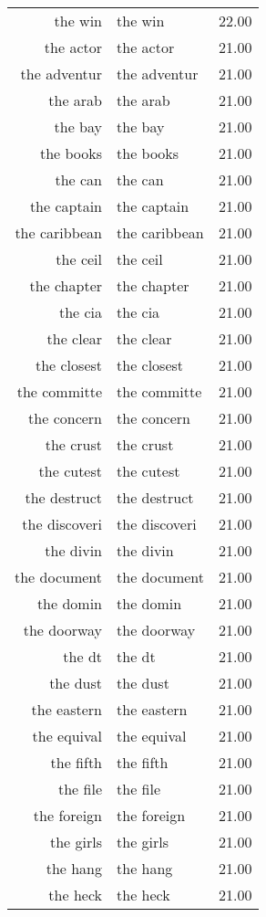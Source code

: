 \begin{table}[ht]
\begin{tabular}{rlr}
  the win & the win & 22.00 \\ 
  the actor & the actor & 21.00 \\ 
  the adventur & the adventur & 21.00 \\ 
  the arab & the arab & 21.00 \\ 
  the bay & the bay & 21.00 \\ 
  the books & the books & 21.00 \\ 
  the can & the can & 21.00 \\ 
  the captain & the captain & 21.00 \\ 
  the caribbean & the caribbean & 21.00 \\ 
  the ceil & the ceil & 21.00 \\ 
  the chapter & the chapter & 21.00 \\ 
  the cia & the cia & 21.00 \\ 
  the clear & the clear & 21.00 \\ 
  the closest & the closest & 21.00 \\ 
  the committe & the committe & 21.00 \\ 
  the concern & the concern & 21.00 \\ 
  the crust & the crust & 21.00 \\ 
  the cutest & the cutest & 21.00 \\ 
  the destruct & the destruct & 21.00 \\ 
  the discoveri & the discoveri & 21.00 \\ 
  the divin & the divin & 21.00 \\ 
  the document & the document & 21.00 \\ 
  the domin & the domin & 21.00 \\ 
  the doorway & the doorway & 21.00 \\ 
  the dt & the dt & 21.00 \\ 
  the dust & the dust & 21.00 \\ 
  the eastern & the eastern & 21.00 \\ 
  the equival & the equival & 21.00 \\ 
  the fifth & the fifth & 21.00 \\ 
  the file & the file & 21.00 \\ 
  the foreign & the foreign & 21.00 \\ 
  the girls & the girls & 21.00 \\ 
  the hang & the hang & 21.00 \\ 
  the heck & the heck & 21.00 \\ 

\end{tabular}
\end{table}
